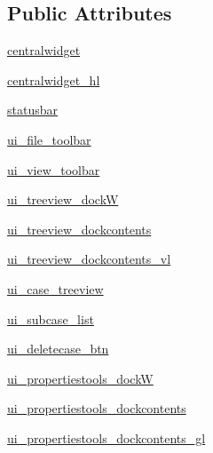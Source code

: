\subsection*{Public Attributes}
\begin{DoxyCompactItemize}
\item 
\hyperlink{classoutput__viewer_u_i_1_1_ui___main_window_a2a323cc6e8e271345a42cb3342820d3b}{centralwidget}
\item 
\hyperlink{classoutput__viewer_u_i_1_1_ui___main_window_a84fbe4915db0698d6779bab59a55b20a}{centralwidget\+\_\+hl}
\item 
\hyperlink{classoutput__viewer_u_i_1_1_ui___main_window_a840ced767970f65402ef894fb5fcc3f3}{statusbar}
\item 
\hyperlink{classoutput__viewer_u_i_1_1_ui___main_window_aa1bd7f326134cd7873cadb8a3e89d866}{ui\+\_\+file\+\_\+toolbar}
\item 
\hyperlink{classoutput__viewer_u_i_1_1_ui___main_window_ada862a642c3a9c359564a67539047d12}{ui\+\_\+view\+\_\+toolbar}
\item 
\hyperlink{classoutput__viewer_u_i_1_1_ui___main_window_aaa6b736b767520bf24e89cfaf72ae15f}{ui\+\_\+treeview\+\_\+dockW}
\item 
\hyperlink{classoutput__viewer_u_i_1_1_ui___main_window_ae11b22f4f511169e79dd98b5e886890d}{ui\+\_\+treeview\+\_\+dockcontents}
\item 
\hyperlink{classoutput__viewer_u_i_1_1_ui___main_window_a6bf94b92513eaa3732c9dfec3f32697c}{ui\+\_\+treeview\+\_\+dockcontents\+\_\+vl}
\item 
\hyperlink{classoutput__viewer_u_i_1_1_ui___main_window_a43692c1dd9ca5ac7d3b92aefb56d3a47}{ui\+\_\+case\+\_\+treeview}
\item 
\hyperlink{classoutput__viewer_u_i_1_1_ui___main_window_ab7e73e16ab3e6b27d3d50400bc8adaa9}{ui\+\_\+subcase\+\_\+list}
\item 
\hyperlink{classoutput__viewer_u_i_1_1_ui___main_window_ab81dbfc042d78295a9c868c026846575}{ui\+\_\+deletecase\+\_\+btn}
\item 
\hyperlink{classoutput__viewer_u_i_1_1_ui___main_window_a8507133b9e49326677916d0b69587180}{ui\+\_\+propertiestools\+\_\+dockW}
\item 
\hyperlink{classoutput__viewer_u_i_1_1_ui___main_window_a26eae51ef2c81417b401501bca6ce10a}{ui\+\_\+propertiestools\+\_\+dockcontents}
\item 
\hyperlink{classoutput__viewer_u_i_1_1_ui___main_window_a83c00b5893231c0eba98a9e8e22ac09c}{ui\+\_\+propertiestools\+\_\+dockcontents\+\_\+gl}

\end{DoxyCompactItemize}
